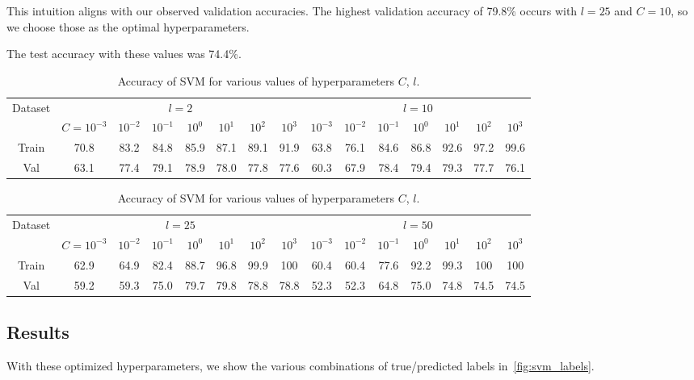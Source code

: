 This intuition aligns with our observed validation accuracies.
The highest validation accuracy of 79.8\% occurs with $l=25$ and $C=10$, so we choose those as the optimal hyperparameters.

The test accuracy with these values was 74.4\%.



\begin{table}[ht!]
\centering
\begin{tabular}{||c| c c c c c c c| c c c c c c c||}  
 \hline
 \multirow{2}{*}{Dataset} &
       \multicolumn{7}{c|}{$l=2$} &
       \multicolumn{7}{c||}{$l=10$} \\
 & $C=10^{-3}$ & $10^{-2}$ & $10^{-1}$ & $10^{0}$ & $10^{1}$ & $10^{2}$ & $10^{3}$ & $10^{-3}$ & $10^{-2}$ & $10^{-1}$ & $10^{0}$ & $10^{1}$ & $10^{2}$ & $10^{3}$ \\ [0.5ex] 
 \hline\hline
 Train & 70.8 & 83.2 & 84.8 & 85.9 & 87.1 & 89.1 & 91.9 & 63.8 & 76.1 & 84.6 & 86.8 & 92.6 & 97.2 & 99.6  \\ \hline
 Val & 63.1 & 77.4 & 79.1 & 78.9 & 78.0 & 77.8 & 77.6 & 60.3 & 67.9 & 78.4 & 79.4 & 79.3 & 77.7 & 76.1  \\ \hline
\end{tabular}
\begin{tabular}{||c| c c c c c c c| c c c c c c c||}  
 \hline
 \multirow{2}{*}{Dataset} &
       \multicolumn{7}{c|}{$l=25$} &
       \multicolumn{7}{c||}{$l=50$} \\
 & $C=10^{-3}$ & $10^{-2}$ & $10^{-1}$ & $10^{0}$ & $10^{1}$ & $10^{2}$ & $10^{3}$ & $10^{-3}$ & $10^{-2}$ & $10^{-1}$ & $10^{0}$ & $10^{1}$ & $10^{2}$ & $10^{3}$ \\ [0.5ex] 
 \hline\hline
 Train & 62.9 & 64.9 & 82.4 & 88.7 & 96.8 & 99.9 & 100 & 60.4 & 60.4 & 77.6 & 92.2 & 99.3 & 100 & 100  \\ \hline
 Val & 59.2 & 59.3 & 75.0 & 79.7 & 79.8 & 78.8 & 78.8 & 52.3 & 52.3 & 64.8 & 75.0 & 74.8 & 74.5 & 74.5  \\ \hline
\end{tabular}
\caption{Accuracy of SVM for various values of hyperparameters $C$, $l$.}
\label{table_svm}
\end{table}

\subsection{Results}
With these optimized hyperparameters, we show the various combinations of true/predicted labels in~\cref{fig:svm_labels}.

